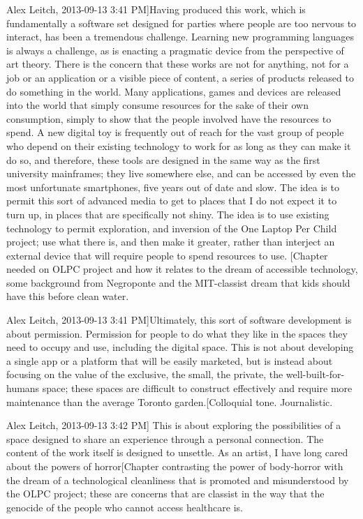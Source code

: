Alex Leitch, 2013-09-13 3:41 PM]Having produced this work, which is fundamentally a software set designed for parties where people are too nervous to interact, has been a tremendous challenge. Learning new programming languages is always a challenge, as is enacting a pragmatic device from the perspective of art theory. There is the concern that these works are not for anything, not for a job or an application or a visible piece of content, a series of products released to do something in the world. Many applications, games and devices are released into the world that simply consume resources for the sake of their own consumption, simply to show that the people involved have the resources to spend. A new digital toy is frequently out of reach for the vast group of people who depend on their existing technology to work for as long as they can make it do so, and therefore, these tools are designed in the same way as the first university mainframes; they live somewhere else, and can be accessed by even the most unfortunate smartphones, five years out of date and slow. The idea is to permit this sort of advanced media to get to places that I do not expect it to turn up, in places that are specifically not shiny. The idea is to use existing technology to permit exploration, and inversion of the One Laptop Per Child project; use what there is, and then make it greater, rather than interject an external device that will require people to spend resources to use.
[Chapter needed on OLPC project and how it relates to the dream of accessible technology, some background from Negroponte and the MIT-classist dream that kids should have this before clean water.

Alex Leitch, 2013-09-13 3:41 PM]Ultimately, this sort of software development is about permission. Permission for people to do what they like in the spaces they need to occupy and use, including the digital space. This is not about developing a single app or a platform that will be easily marketed, but is instead about focusing on the value of the exclusive, the small, the private, the well-built-for-humans space; these spaces are difficult to construct effectively and require more maintenance than the average Toronto garden.[Colloquial tone. Journalistic.

Alex Leitch, 2013-09-13 3:42 PM] This is about exploring the possibilities of a space designed to share an experience through a personal connection.
The content of the work itself is designed to unsettle. As an artist, I have long cared about the powers of horror[Chapter contrasting the power of body-horror with the dream of a technological cleanliness that is promoted and misunderstood by the OLPC project; these are concerns that are classist in the way that the genocide of the people who cannot access healthcare is. 

